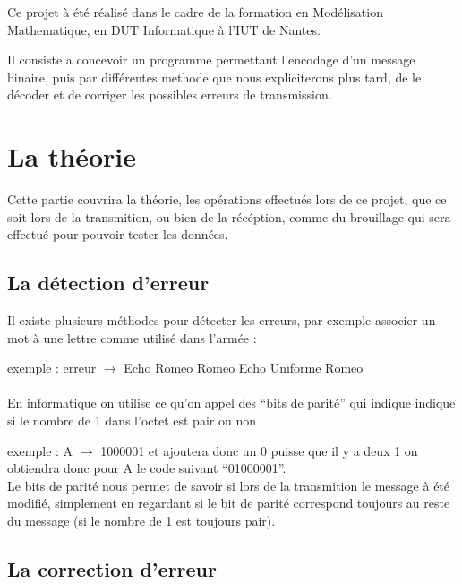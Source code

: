 \documentclass[12pt]{article}
\begin{document}
Ce projet à été réalisé dans le cadre de la formation en Modélisation Mathematique, en DUT Informatique à l'IUT de Nantes.

Il consiste a concevoir un programme permettant l'encodage d'un message binaire, puis par différentes methode que nous expliciterons plus tard, de le décoder et de corriger les possibles erreurs de transmission.


\section{La théorie}
\label{sec:theorie}

Cette partie couvrira la théorie, les opérations effectués lors de ce projet, que ce soit lors de la transmition, ou bien de la récéption, comme du brouillage qui sera effectué pour pouvoir tester les données.

\subsection{La détection d'erreur}
\label{sub:La détection d'erreur}

Il existe plusieurs méthodes pour détecter les erreurs, par exemple associer un mot à une lettre comme utilisé dans l'armée :

\tab exemple : erreur $\rightarrow$ Echo Romeo Romeo Echo Uniforme Romeo
\\
\\ En informatique on utilise ce qu'on appel des ``bits de parité'' qui indique indique si le nombre de 1 dans l'octet est pair ou non

\tab exemple : A $\rightarrow$ 1000001 et ajoutera donc un 0 puisse que il y a deux 1 on obtiendra donc pour A le code suivant ``01000001''.
\\ Le bits de parité nous permet de savoir si lors de la transmition le message à été modifié, simplement en regardant si le bit de parité correspond toujours au reste du message (si le nombre de 1 est toujours pair).

\subsection{La correction d'erreur}
\label{sub:La correction d'erreur}
\end{document}
